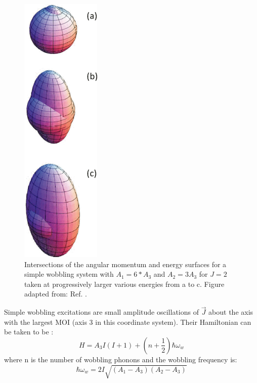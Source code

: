 \begin{figure}[t!]
\centerline{\includegraphics[height=0.35\textheight]{./img/c2/simple_am_orbits.png}}
	\caption{Intersections of the angular momentum and energy surfaces for a simple wobbling system with $A_1=6*A_3$ and $A_2=3A_3$ for $J=2$ taken at progressively larger various energies from a to c. Figure adapted from: Ref. \cite{frauendorfTransverseWobbling}.\label{fig:chp2-classical-am-orbits}}
\end{figure}

Simple wobbling excitations are small amplitude oscillations of $\vec{J}$ about the axis with the largest MOI (axis 3 in this coordinate system). Their Hamiltonian can be taken to be \cite{frauendorfTransverseWobbling}:
\begin{equation}
\label{eqn:chp2-simple-wobb-hamil}
H=A_3I(I+1)+(n+\frac{1}{2})\hbar\omega_w
\end{equation}
where n is the number of wobbling phonons and the wobbling frequency is:
\begin{equation}
\label{eqn:chp2-simple-wobb-freq-theory}
\hbar\omega_w=2I\sqrt{(A_1-A_3)(A_2-A_3)}
\end{equation}


